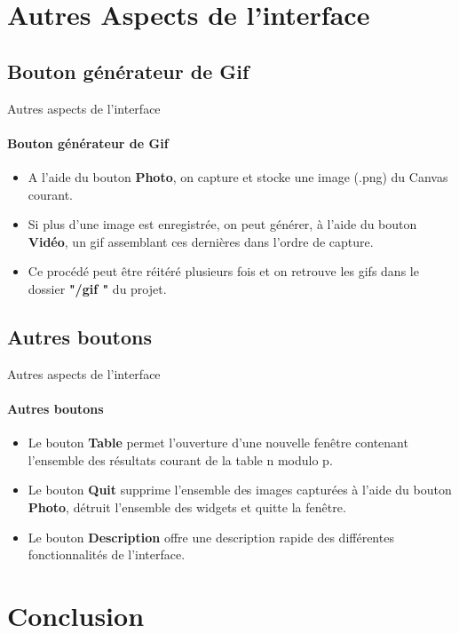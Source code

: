 \documentclass{beamer}
\begin{document}
\section{Autres Aspects de l'interface}
\subsection{Bouton générateur de Gif}
\begin{frame}{Autres aspects de l'interface}
\framesubtitle{Bouton générateur de Gif}
\begin{itemize}
\item A l'aide du bouton \textbf{Photo}, on capture et stocke une image (.png) du Canvas courant.
\item Si plus d'une image est enregistrée, on peut générer, à l'aide du bouton \textbf{Vidéo}, un gif assemblant ces dernières dans l'ordre de capture.
\item Ce procédé peut être réitéré plusieurs fois et on retrouve les gifs dans le dossier \textbf{"/gif "} du projet.
\end{itemize} 
\end{frame}

\subsection{Autres boutons}
\begin{frame}{Autres aspects de l'interface}
\framesubtitle{Autres boutons}
\begin{itemize}
\item Le bouton \textbf{Table} permet l'ouverture d'une nouvelle fenêtre contenant l'ensemble des résultats courant de la table n modulo p.
\item Le bouton \textbf{Quit} supprime l'ensemble des images capturées à l'aide du bouton \textbf{Photo}, détruit l'ensemble des widgets et quitte la fenêtre.
\item Le bouton \textbf{Description} offre une description rapide des différentes fonctionnalités de l'interface.
\end{itemize}
\end{frame}

\section{Conclusion}
\end{document}
